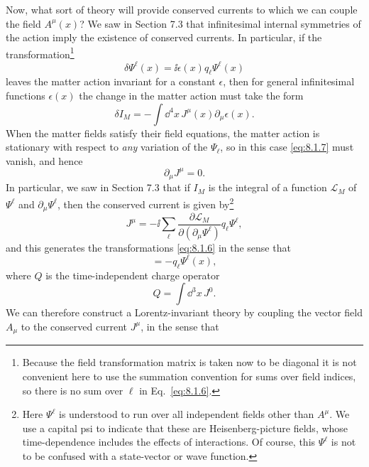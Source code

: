 Now, what sort of theory will provide conserved currents to which we
can couple the field $A^\mu(x)$? We saw in Section 7.3 that infinitesimal internal
symmetries of the action imply the existence of conserved currents. In
particular, if the transformation\footnote{Because the field transformation
matrix is taken now to be diagonal it is not convenient here to use the
summation convention for sums over field indices, so there is no sum over
$\ell$ in Eq.~\eqref{eq:8.1.6}.}
\begin{equation}
  \delta\Psi^\ell(x)=\ii\epsilon(x)q_\ell\Psi^\ell(x)
  \tag{8.1.6}\label{eq:8.1.6}
\end{equation}
leaves the matter action invariant for a constant $\epsilon$, then for general
infinitesimal functions $\epsilon(x)$ the change in the matter action must take the
form
\begin{equation}
  \delta I_M=-\int \dd^4x\,J^\mu(x)\partial_\mu\epsilon(x).
  \tag{8.1.7}\label{eq:8.1.7}
\end{equation}
When the matter fields satisfy their field equations, the matter action is
stationary with respect to \textit{any} variation of the $\Psi_\ell$, so in this case \eqref{eq:8.1.7}
must vanish, and hence
\begin{equation}
  \partial_\mu J^\mu=0.
  \tag{8.1.8}\label{eq:8.1.8}
\end{equation}
In particular, we saw in Section 7.3 that if $I_M$ is the integral of a function
$\mathcal L_M$ of $\Psi^\ell$ and $\partial_\mu\Psi^\ell$, then the conserved current is given by\footnote{Here
$\Psi^\ell$ is understood to run over all independent fields other than
$A^\mu$. We use a capital psi to indicate that these are Heisenberg-picture
fields, whose time-dependence includes the effects of interactions. Of course,
this $\Psi^\ell$ is not to be confused with a state-vector or wave function.}
\[
  J^\mu=-\ii\sum_\ell
  \frac{\partial\mathcal L_M}{\partial(\partial_\mu\Psi^\ell)}
  q_\ell\Psi^\ell,
\]
and this generates the transformations \eqref{eq:8.1.6} in the sense that
\begin{equation}
  [Q,\Psi^\ell(x)]=-q_\ell\Psi^\ell(x),
  \tag{8.1.9}\label{eq:8.1.9}
\end{equation}
where $Q$ is the time-independent charge operator
\begin{equation}
  Q=\int \dd^3x\,J^0.
  \tag{8.1.10}\label{eq:8.1.10}
\end{equation}
We can therefore construct a Lorentz-invariant theory by coupling the
vector field $A_\mu$ to the conserved current $J^\mu$, in the sense that
